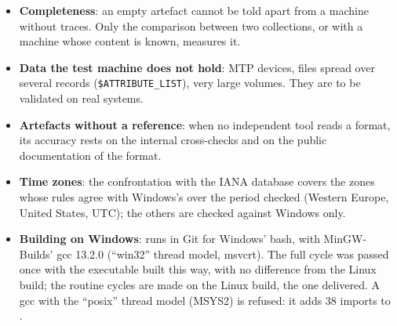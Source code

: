 \documentclass[11pt,a4paper,oneside]{report}
\begin{document}
\begin{itemize}
  \item \textbf{Completeness}: an empty artefact cannot be told apart from a
    machine without traces. Only the comparison between two collections, or
    with a machine whose content is known, measures it.
  \item \textbf{Data the test machine does not hold}: MTP devices,
    files spread over several  records
    (\texttt{\$ATTRIBUTE\_LIST}), very large volumes. They are to be validated
    on real systems.
  \item \textbf{Artefacts without a reference}: when no independent tool reads
    a format, its accuracy rests on the internal cross-checks and on the public
    documentation of the format.
  \item \textbf{Time zones}: the confrontation with the IANA database covers
    the zones whose rules agree with Windows's over the period checked
    (Western Europe, United States, UTC); the others are checked against
    Windows only.
  \item \textbf{Building on Windows}:  runs
     in Git for Windows' bash, with MinGW-Builds' gcc
    13.2.0 (``win32'' thread model, msvcrt). The full cycle was passed once with
    the executable built this way, with no difference from the Linux build; the
    routine cycles are made on the Linux build, the one delivered. A gcc with
    the ``posix'' thread model (MSYS2) is refused: it adds 38 imports to
    .
\end{itemize}
\end{document}
